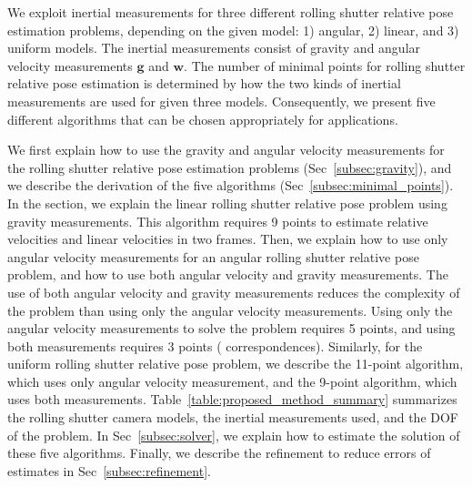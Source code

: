\documentclass[10pt,twocolumn,letterpaper]{article}
\theoremstyle{definition}
\begin{document}
	
	We exploit inertial measurements for three different rolling shutter relative pose estimation problems, depending on the given model: 1) angular, 2) linear, and 3) uniform models.
	The inertial measurements consist of gravity and angular velocity measurements $\mathbf{g}$ and $\mathbf{w}$.
	The number of minimal points for rolling shutter relative pose estimation is determined by how the two kinds of inertial measurements are used for given three models.
	Consequently, we present five different algorithms that can be chosen appropriately for applications.
	
	
	We first explain how to use the gravity and angular velocity measurements for the rolling shutter relative pose estimation problems (Sec~\ref{subsec:gravity}),
	and we describe the derivation of the five algorithms (Sec~\ref{subsec:minimal_points}).
	In the section, we explain the linear rolling shutter relative pose problem using gravity measurements.
	This algorithm requires 9 points to estimate relative velocities and linear velocities in two frames.
	Then, we explain how to use only angular velocity measurements for an angular rolling shutter relative pose problem, and how to use both angular velocity and gravity measurements.
	The use of both angular velocity and gravity measurements reduces the complexity of the problem than using only the angular velocity measurements. 
	Using only the angular velocity measurements to solve the problem requires 5 points, and using both measurements requires 3 points ( correspondences).
	Similarly, for the uniform rolling shutter relative pose problem, we describe the 11-point algorithm, which uses only angular velocity measurement, and the 9-point algorithm, which uses both measurements.
	Table~\ref{table:proposed_method_summary} summarizes the rolling shutter camera models, the inertial measurements used, and the DOF of the problem. 
	In Sec~\ref{subsec:solver}, we explain how to estimate the solution of these five algorithms.
	Finally, we describe the refinement to reduce errors of estimates in Sec~\ref{subsec:refinement}.
	
\end{document}
